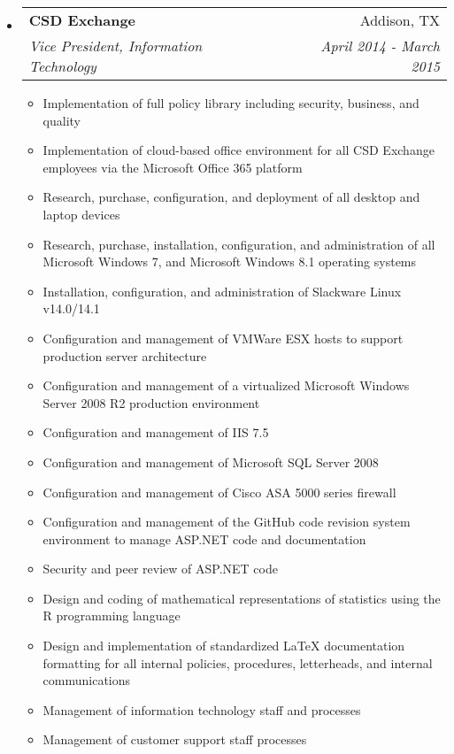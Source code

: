 \documentclass[letterpaper,11pt]{article}
\makeatletter
\newcommand{\resitem}[1]{\item #1 \vspace{-2pt}}
\newcommand{\ressubheading}[4]{
\begin{tabular*}{6.5in}{l@{\cftdotfill{\cftsecdotsep}\extracolsep{\fill}}r}
		\textbf{#1} & #2 \\
		\textit{#3} & \textit{#4} \\
\end{tabular*}\vspace{-6pt}}
\makeatother
\begin{document}
\begin{itemize}
\item
	\ressubheading{CSD Exchange}{Addison, TX}{Vice President, Information Technology}{April 2014 - March 2015}
	\begin{itemize}
    \resitem{Implementation of full policy library including security, business, and quality}
    \resitem{Implementation of cloud-based office environment for all CSD Exchange employees via the Microsoft Office 365 platform}
    \resitem{Research, purchase, configuration, and deployment of all desktop and laptop devices}
    \resitem{Research, purchase, installation, configuration, and administration of all Microsoft Windows 7, and Microsoft Windows 8.1 operating systems}
    \resitem{Installation, configuration, and administration of Slackware Linux v14.0/14.1}
    \resitem{Configuration and management of VMWare ESX hosts to support production server architecture}
    \resitem{Configuration and management of a virtualized Microsoft Windows Server 2008 R2 production environment}
    \resitem{Configuration and management of IIS 7.5}
    \resitem{Configuration and management of Microsoft SQL Server 2008}
    \resitem{Configuration and management of Cisco ASA 5000 series firewall}
    \resitem{Configuration and management of the GitHub code revision system environment to manage ASP.NET code and documentation}
    \resitem{Security and peer review of ASP.NET code}
    \resitem{Design and coding of mathematical representations of statistics using the R programming language}
    \resitem{Design and implementation of standardized LaTeX documentation formatting for all internal policies, procedures, letterheads, and internal communications}
    \resitem{Management of information technology staff and processes}
    \resitem{Management of customer support staff processes}
	\end{itemize}


\end{itemize}
\end{document}
